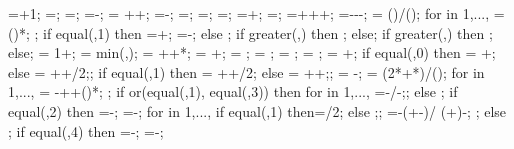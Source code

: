 {{\rightlevel=\rightstory+1;
\rightwallh=\rightstory*\storyheight;
\rightopenh=\rightopenstory*\storyheight;
\diffwallh=\leftwallh-\rightwallh;
\soilbelowfoundtof = \soilbelowfound+\supportheight+\hsdistbottom;
\basewallstartx=-\supportwidth;
\buildingwidth=\baynumber*\baywidth;
\basewalldepth=\subfloors*\storyheight;
\basewallstarty=\basewalldepth;
\basewallendx=\buildingwidth+\supportwidth;
\basewallendy=\basewallstarty;
\rightsoilx=\hsdistright+\supportwidth+\buildingwidth+\rightsoildist;
\rightsoily=\rightwallh-\rightsoildepth-\supportheight-\hsdistbottom;
\isospace = (\buildingwidth)/();
for \kiso in {1,...,{\numberofisolators}}{
\xiso{\kiso} = ()*\isospace;
};
if equal(\isoshiftyn,1) then
{=+\isoshift;
\xiso{\numberofisolators}=\xiso{\numberofisolators}-\isoshift;}
else {};
if greater(\doflocfloor,\storynumber) then {;} else{};
if greater(\dofloccolumn,\columnnumber) then {;} else{};
\dofloch = 1+\doflocfloor;
\minlen = min(\storyheight,\baywidth);
\dofxx = \x{\dofloccolumn}+\dofoffsetratio*\minlen+*\showdefl;
\dofyy = \y{\dofloch}+\dofoffsetratio*\minlen;
\arrlen = \arrowlenratio*\minlen;
\arrrad = \rotarrowlenratio*\minlen;
\Xaxesstarty = ;
\Yaxesstartx = ;
\Yaxesstarty = \y{\levelnumber}+\axisseperation;
if equal(\showsupports,0) then
{\Xaxesstartx = \x{\columnnumber}+\axisseperation;} else
{\Xaxesstartx = \x{\columnnumber}+\axisseperation+\supportwidth/2;};
if equal(\showsupports,1) then
{\Xaxesstartx = \x{\columnnumber}+\axisseperation+\supportwidth/2;} else
{\Xaxesstartx = \x{\columnnumber}+\axisseperation+\supportwidth;};
\pilecoordy = -\supportheight;
\pilespace = 
(2*\supportwidth+*\pilesidespace)/();
for \pileind in {1,...,{\numberofpiles}}{
\pilecoordx{\pileind} = -\supportwidth+\pilesidespace+()*\pilespace;
};
if or(equal(\latloadtype,1), equal(\latloadtype,3)) then {
for \iarr in {1,...,{\levelnumber}}{
	\arrstartx{\iarr}=-\toparrlen*\y{\iarr}/\structheight-\latloadshift;};
} else {};
if equal(\latloadtype,2) then {
	=-\latloadshift;
	=-\isomidy;
	for \iarr in {1,...,{\levelnumber}}{
		if equal(\iarr,1) then{\addtempy=\supportheight/2;} else {;};
		\arrstartx{\iarr}=-\toparrlen*(\y{\iarr}+\isomidy-\addtempy)/
		(\structheight+\isomidy)-\latloadshift;
	};
} else {};
if equal(\latloadtype,4) then {
	=-\latloadshift;
	=-\isomidy;
}}}
